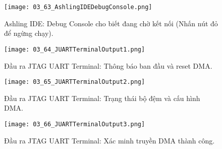 \begin{figure}[htbp] \centering \texttt{[image: 03\_63\_AshlingIDEDebugConsole.png]} \caption{Ashling IDE: Debug Console cho biết đang chờ kết nối (Nhấn nút đỏ để ngừng chạy).} \label{fig:03_63} \end{figure}
\begin{figure}[htbp] \centering \texttt{[image: 03\_64\_JUARTTerminalOutput1.png]} \caption{Đầu ra JTAG UART Terminal: Thông báo ban đầu và reset DMA.} \label{fig:03_64} \end{figure}
\begin{figure}[htbp] \centering \texttt{[image: 03\_65\_JUARTTerminalOutput2.png]} \caption{Đầu ra JTAG UART Terminal: Trạng thái bộ đệm và cấu hình DMA.} \label{fig:03_65} \end{figure}
\begin{figure}[htbp] \centering \texttt{[image: 03\_66\_JUARTTerminalOutput3.png]} \caption{Đầu ra JTAG UART Terminal: Xác minh truyền DMA thành công.} \label{fig:03_66} \end{figure}

\FloatBarrier


